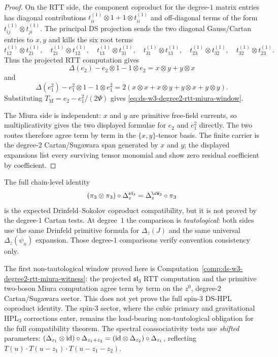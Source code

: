 \begin{proof}
On the RTT side, the component coproduct for the degree-$1$
matrix entries has diagonal contributions
$t_{ii}^{(1)}\otimes1+1\otimes t_{ii}^{(1)}$ and off-diagonal
terms of the form \(t_{ij}^{(1)}\otimes t_{ji}^{(1)}\).
The principal DS projection sends the two diagonal Gauss/Cartan
entries to \(x,y\) and kills the six root terms
\[
 t_{12}^{(1)}\otimes t_{21}^{(1)},\quad
 t_{21}^{(1)}\otimes t_{12}^{(1)},\quad
 t_{13}^{(1)}\otimes t_{31}^{(1)},\quad
 t_{31}^{(1)}\otimes t_{13}^{(1)},\quad
 t_{23}^{(1)}\otimes t_{32}^{(1)},\quad
 t_{32}^{(1)}\otimes t_{23}^{(1)} .
\]
Thus the projected RTT computation gives
\[
 \Delta(e_2)-e_2\otimes1-1\otimes e_2
 =x\otimes y+y\otimes x
\]
and
\[
 \Delta(e_1^2)-e_1^2\otimes1-1\otimes e_1^2
 =2(x\otimes x+x\otimes y+y\otimes x+y\otimes y).
\]
Substituting \(T_{\mathrm{M}}=e_2-e_1^2/(2\Psi)\) gives
\eqref{eq:ds-w3-degree2-rtt-miura-window}.

The Miura side is independent: \(x\) and \(y\) are primitive
free-field currents, so multiplicativity gives the two displayed
formulae for \(e_2\) and \(e_1^2\) directly.  The two routes
therefore agree term by term in the \(\{x,y\}\)-tensor basis.
The finite carrier is the degree-$2$ Cartan/Sugawara span generated by
$x$ and $y$; the displayed expansions list every surviving tensor
monomial and show zero residual coefficient by coefficient.
\end{proof}

\begin{remark}
\label{rem:ds-intertwining-w3}
The full chain-level identity
\[
(\pi_3 \otimes \pi_3)\circ\Delta_z^{\mathfrak{sl}_3}
=\Delta_z^{\cW_3}\circ\pi_3
\]
is the expected Drinfeld--Sokolov coproduct compatibility, but
it is not proved by the degree-$1$ Cartan tests.  At degree~$1$
the comparison is \emph{tautological}: both sides use the same
Drinfeld primitive formula for \(\Delta_z(J)\) and the same
universal \(\Delta_z(\psi_n)\) expansion.  Those degree-$1$
comparisons verify convention consistency only.

The first non-tautological window proved here is
Computation~\ref{comp:ds-w3-degree2-rtt-miura-witness}: the
projected $\mathfrak{sl}_3$ RTT computation and the primitive
two-boson Miura computation agree term by term on the
$z^0$, degree-$2$ Cartan/Sugawara sector.  This does not yet
prove the full spin-$3$ DS-HPL coproduct identity.  The spin-$3$
sector, where the cubic primary and gravitational
\(\mathrm{HPL}_3\) corrections enter, remains the load-bearing
non-tautological obligation for the full compatibility theorem.
The spectral coassociativity tests use \emph{shifted} parameters:
$(\Delta_{z_1} \otimes \mathrm{id}) \circ \Delta_{z_1 + z_2}
= (\mathrm{id} \otimes \Delta_{z_2}) \circ \Delta_{z_1}$,
reflecting $T(u) \cdot T(u - z_1) \cdot T(u - z_1 - z_2)$.
\end{remark}

